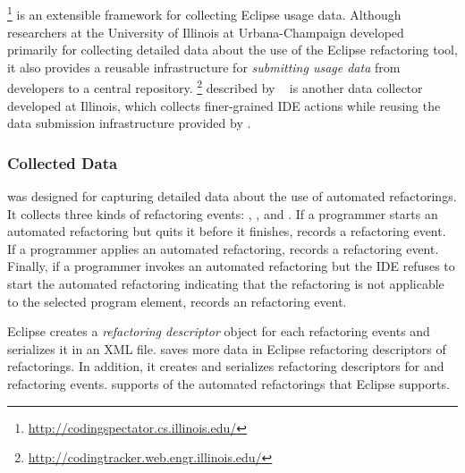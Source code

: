 
\subsection{\CodingSpectator}
\label{CodingSpectator}

\CodingSpectator \footnote{\url{http://codingspectator.cs.illinois.edu/}}  is
an extensible framework for collecting Eclipse usage data. Although
researchers at the University of Illinois at Urbana-Champaign
developed \CodingSpectator{} primarily for collecting detailed data
about the use of the Eclipse refactoring tool, it also provides a
reusable infrastructure for \emph{submitting usage data} from developers to
a central repository.  
\CodingTracker \footnote{\url{http://codingtracker.web.engr.illinois.edu/}} described by  ~\cite{NegaraETAL2012Dangerous,NegaraETAL2013ManualRefactorings} is another
data collector developed at Illinois, which collects finer-grained IDE
actions while reusing the data submission infrastructure provided by
\CodingSpectator.

\subsubsection{Collected Data}

\CodingSpectator{} was designed for capturing detailed data about the use of
automated refactorings. It collects three kinds of refactoring events:
\Canceled, \Performed, and \Unavailable. If a programmer starts an automated
refactoring but quits it before it finishes, \CodingSpectator{} records a
\Canceled{} refactoring event. If a programmer applies an automated refactoring,
\CodingSpectator{} records a \Performed{} refactoring event. Finally, if
a programmer invokes an automated refactoring but the IDE refuses to start the
automated refactoring indicating that the refactoring is not applicable to the
selected program element, \CodingSpectator{} records an \Unavailable{}
refactoring event.

Eclipse creates a \emph{refactoring descriptor} object for each \Performed{}
refactoring events and serializes it in an XML file. \CodingSpectator{} saves
more data in Eclipse refactoring descriptors of \Performed{} refactorings. In
addition, it creates and serializes refactoring descriptors for \Canceled{} and
\Unavailable{} refactoring events. \CodingSpectator{} supports
 of the
 automated refactorings that Eclipse
supports.

